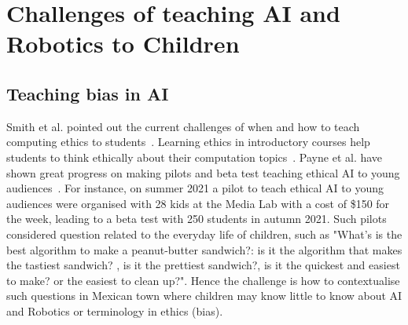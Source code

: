 \documentclass[sigconf,anonymous,review]{acmart}
\begin{document}
\section{Challenges of teaching AI and Robotics to Children}
\subsection{Teaching bias in AI}
Smith et al. pointed out the current challenges of when and how to teach computing ethics to students~\cite{smith2022incorporating}.
Learning ethics in introductory courses help students to think ethically about their computation topics~\cite{fiesler2021}.
Payne et al. have shown great progress on making pilots and beta test teaching ethical AI to young audiences~\cite{payne2020}.
For instance, on summer 2021 a pilot to teach ethical AI to young audiences were organised with 28 kids at the Media Lab with a cost of \$150 for the week, leading to a beta test with 250 students in autumn 2021. Such pilots considered question related to the everyday life of children, such as 
"What's is the best algorithm to make a peanut-butter sandwich?: is it the algorithm that makes the tastiest sandwich? , is it the prettiest sandwich?, is it the quickest and easiest to make? or the easiest to clean up?". Hence the challenge is how to contextualise such questions in Mexican town where children may know little to know about AI and Robotics or terminology in ethics (bias).

\end{document}
